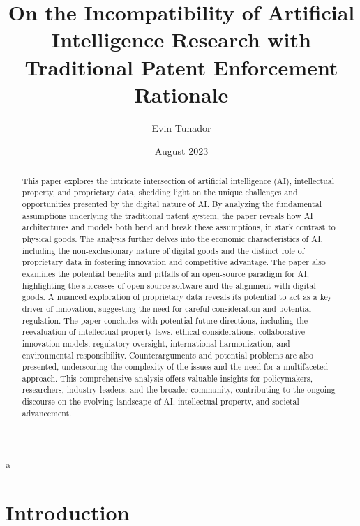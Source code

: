 a\documentclass{article}[10pt]
\title{On the Incompatibility of Artificial Intelligence Research with Traditional Patent Enforcement Rationale}
\author{Evin Tunador}
\date{August 2023}
\begin{document}
\fancyhead{} %
\renewcommand{\headrulewidth}{0pt}

\maketitle

\begin{abstract}
    This paper explores the intricate intersection of artificial intelligence (AI), intellectual property, and proprietary data, shedding light on the unique challenges and opportunities presented by the digital nature of AI. 
    By analyzing the fundamental assumptions underlying the traditional patent system, the paper reveals how AI architectures and models both bend and break these assumptions, in stark contrast to physical goods. 
    The analysis further delves into the economic characteristics of AI, including the non-exclusionary nature of digital goods and the distinct role of proprietary data in fostering innovation and competitive advantage. 
    The paper also examines the potential benefits and pitfalls of an open-source paradigm for AI, highlighting the successes of open-source software and the alignment with digital goods. 
    A nuanced exploration of proprietary data reveals its potential to act as a key driver of innovation, suggesting the need for careful consideration and potential regulation. 
    The paper concludes with potential future directions, including the reevaluation of intellectual property laws, ethical considerations, collaborative innovation models, regulatory oversight, international harmonization, and environmental responsibility. 
    Counterarguments and potential problems are also presented, underscoring the complexity of the issues and the need for a multifaceted approach. 
    This comprehensive analysis offers valuable insights for policymakers, researchers, industry leaders, and the broader community, contributing to the ongoing discourse on the evolving landscape of AI, intellectual property, and societal advancement. 
\end{abstract}

\newpage
\tableofcontents
\newpage

\section{Introduction}
\end{document}
